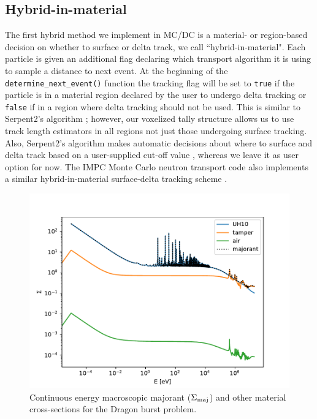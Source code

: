 \subsection{Hybrid-in-material}
\label{sec:material_exc}


The first hybrid method we implement in MC/DC is a material- or region-based decision on whether to surface or delta track, we call ``hybrid-in-material".
Each particle is given an additional flag declaring which transport algorithm it is using to sample a distance to next event.
At the beginning of the \texttt{determine\_next\_event()} function the tracking flag will be set to \texttt{true} if the particle is in a material region declared by the user to undergo delta tracking or \texttt{false} if in a region where delta tracking should not be used. 
This is similar to Serpent2's algorithm \cite{leppanen_use_2017}; however, our voxelized tally structure allows us to use track length estimators in all regions not just those undergoing surface tracking.
Also, Serpent2's algorithm makes automatic decisions about where to surface and delta track based on a user-supplied cut-off value \cite{leppanen_development_2013}, whereas we leave it as user option for now.
The IMPC Monte Carlo neutron transport code also implements a similar hybrid-in-material surface-delta tracking scheme \cite{fang_development_2022}.


\begin{figure}
    \centering
    \includegraphics[width=\textwidth]{figures/delta_figs/macro_majorant_dragon.pdf}
    \caption{Continuous energy macroscopic majorant ($\Sigma_{\text{maj}}$) and other material cross-sections for the Dragon burst problem.}
    \label{fig:majorant_dragon}
\end{figure}

